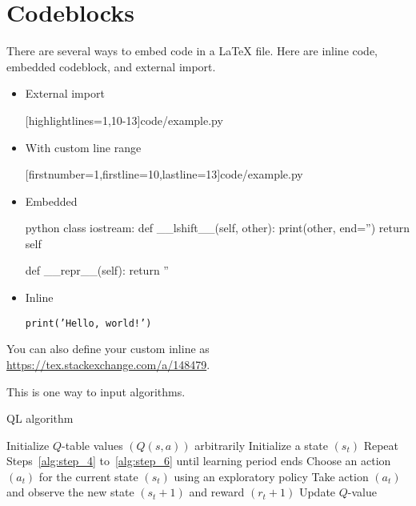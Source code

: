\section{Codeblocks}
There are several ways to embed code in a \LaTeX{} file.
Here are inline code, embedded codeblock, and external import.

\begin{itemize}
  \item External import

  [highlightlines={1,10-13}]{code/example.py}

  \item With custom line range

  [firstnumber=1,firstline=10,lastline=13]{code/example.py}

  \item Embedded

  \begin{code}{python}
  class iostream:
      def __lshift__(self, other):
          print(other, end='')
          return self

      def __repr__(self):
          return ''
  \end{code}

  \item Inline

  \texttt{print('Hello, world!')}
\end{itemize}

You can also define your custom inline as \url{https://tex.stackexchange.com/a/148479}.

This is one way to input algorithms.

\begin{algorithm}[H]
  \caption{QL algorithm}
  Initialize \(Q\)-table values \((Q(s, a))\) arbitrarily\;
  Initialize a state \((s_t)\)\;
  Repeat Steps~\ref{alg:step_4} to~\ref{alg:step_6} until learning period ends\;
  Choose an action \((a_t)\) for the current state \((s_t)\) using an exploratory policy\; 
  Take action \((a_t)\) and observe the new state \((s_t + 1)\) and reward \((r_t + 1)\)\;
  Update \(Q\)-value\; 
\end{algorithm}
